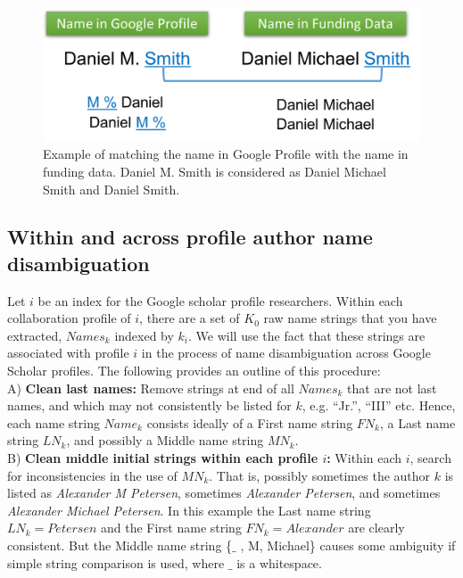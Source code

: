 \begin{figure}[H]
\begin{center}
  \includegraphics[width=.9\textwidth]{figures/fig-name-dis-example2}
\caption{Example of matching the name in Google Profile with the name in funding data. Daniel M. Smith is considered as Daniel Michael Smith and Daniel Smith.}
\label{alg-example}
\end{center}
\end{figure}




\subsection{Within and across profile author name disambiguation}

Let $i$ be an index for the Google scholar profile researchers. Within each collaboration profile of $i$,  there are a set of $K_{0}$ raw name strings that you have extracted,  $Names_{k}$ indexed by $k_{i}$. We will use the fact that these strings are associated with profile $i$ in the process of name disambiguation across Google Scholar profiles. The following provides an outline of this procedure: \\


A) {\bf Clean last names:}
Remove strings at end of all $Names_{k}$ that are not last names, and which may not consistently be listed for $k$, e.g. ``Jr.'', ``III'' etc. Hence, each name string  $Name_{k}$ consists ideally of a First name string $FN_{k}$, a Last name string $LN_{k}$, and possibly a Middle name string $MN_{k}$. \\

B)  {\bf Clean middle initial strings within each profile $i$:}  Within each $i$, search for inconsistencies in the use of $MN_{k}$. That is, possibly sometimes the author $k$ is listed as {\it Alexander M Petersen}, sometimes {\it Alexander Petersen}, and sometimes {\it Alexander Michael Petersen}. In this example the Last name string $LN_{k} = Petersen$ and the First name string $FN_{k} = Alexander$ are clearly consistent. But the Middle name string \{$\_$ , M, Michael\} causes some ambiguity if simple string comparison is used,  where $\_$ is a whitespace.

